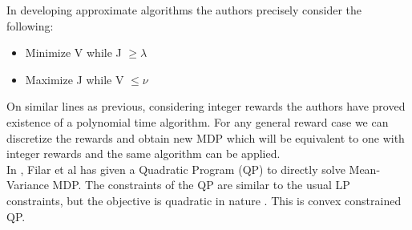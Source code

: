 \documentclass[11pt,a4paper,oneside]{report}
\begin{document}
In developing approximate algorithms the authors precisely consider the following:
\begin{itemize}
\item Minimize V while J $\geq \lambda$
\item Maximize J while V $\leq \nu$
\end{itemize}
On similar lines as previous, considering integer rewards the authors have proved existence of a polynomial time algorithm. For any general reward case we can discretize the rewards and obtain new MDP which will be equivalent to one with integer rewards and the same algorithm can be applied.\\

In \citep{filar1989variance}, Filar et al has given a Quadratic Program (QP) to directly solve Mean-Variance MDP. The constraints of the QP are similar to the usual LP constraints, but the objective is quadratic in nature \cite[equations(2.9)]{filar1989variance}. This is convex constrained QP.
\end{document}
